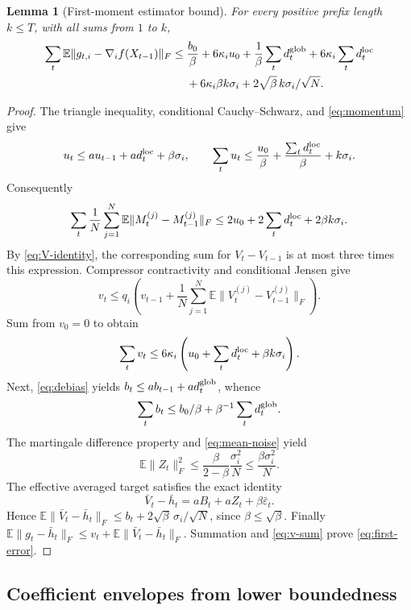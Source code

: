 \documentclass[11pt]{article}
\newtheorem{lemma}{Lemma}
\newcommand{\E}{\mathbb E}
\newcommand{\frob}[1]{\lVert #1\rVert_F}
\newcommand{\avg}{\frac1N\sum_{j=1}^N}
\begin{document}
\begin{lemma}[First-moment estimator bound]\label{lem:first}
For every positive prefix length $k\le T$, with all sums from $1$ to $k$,
\begin{align}\label{eq:first-error}
 \sum_t\E\frob{g_{t,i}-\nabla_i f(X_{t-1})}
 \le{}&\frac{b_0}\beta+6\kappa_i u_0
       +\frac1\beta\sum_t d_t^{\rm glob}
       +6\kappa_i\sum_td_t^{\rm loc}\notag\\
       &+6\kappa_i\beta k\sigma_i
        +2\sqrt\beta\,k\sigma_i/\sqrt N.
\end{align}
\end{lemma}
\begin{proof}
The triangle inequality, conditional Cauchy--Schwarz, and
\eqref{eq:momentum} give
\[
 u_t\le au_{t-1}+a d_t^{\rm loc}+\beta\sigma_i,
 \qquad
 \sum_tu_t\le\frac{u_0}\beta+
        \frac{\sum_td_t^{\rm loc}}\beta+k\sigma_i.
\]
Consequently
\[
 \sum_t\avg\E\frob{M_t^{(j)}-M_{t-1}^{(j)}}
 \le2u_0+2\sum_td_t^{\rm loc}+2\beta k\sigma_i.
\]
By \eqref{eq:V-identity}, the corresponding sum for $V_t-V_{t-1}$
is at most three times this expression. Compressor contractivity and
conditional Jensen give
\[
 v_t\le q_i\left(v_{t-1}+
               \avg\E\frob{V_t^{(j)}-V_{t-1}^{(j)}}\right).
\]
Sum from $v_0=0$ to obtain
\begin{equation}\label{eq:v-sum}
 \sum_tv_t\le6\kappa_i
        \left(u_0+\sum_td_t^{\rm loc}+\beta k\sigma_i\right).
\end{equation}
Next, \eqref{eq:debias} yields
$b_t\le ab_{t-1}+a d_t^{\rm glob}$, whence
\[
 \sum_tb_t\le b_0/\beta+\beta^{-1}\sum_td_t^{\rm glob}.
\]
The martingale difference property and \eqref{eq:mean-noise} yield
\begin{equation}\label{eq:Z-bound}
 \E\frob{Z_t}^2\le\frac{\beta}{2-\beta}\frac{\sigma_i^2}N
 \le\frac{\beta\sigma_i^2}N.
\end{equation}
The effective averaged target satisfies the exact identity
\[
 \bar V_t-\bar h_t=aB_t+aZ_t+\beta\bar\varepsilon_t.
\]
Hence $\E\frob{\bar V_t-\bar h_t}
\le b_t+2\sqrt\beta\,\sigma_i/\sqrt N$, since $\beta\le\sqrt\beta$.
Finally $\E\frob{g_t-\bar h_t}\le v_t+
\E\frob{\bar V_t-\bar h_t}$. Summation and \eqref{eq:v-sum}
prove \eqref{eq:first-error}.
\end{proof}

\subsection{Coefficient envelopes from lower boundedness}
\end{document}
